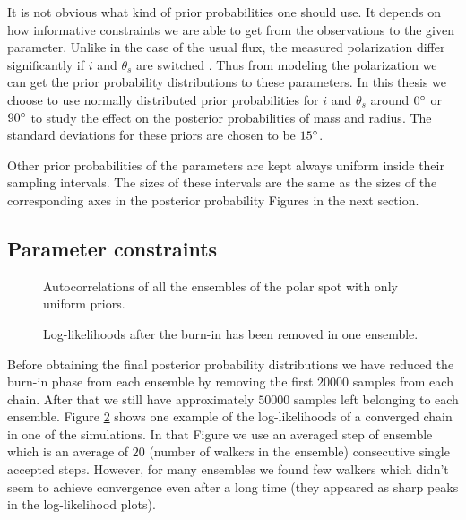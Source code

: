 \documentclass{wihuri}
\def\thetas{\theta_{s}}
\begin{document}
It is not obvious what kind of prior probabilities one should use. It depends on how informative constraints we are able to get from the observations to the given parameter. Unlike in the case of the usual flux, the measured polarization differ significantly if $i$ and $\thetas$ are switched \cite{poutaviironen}. Thus from modeling the polarization we can get the prior probability distributions to these parameters. In this thesis we choose to use normally distributed prior probabilities for $i$ and $\thetas$ around $0 \degree$ or $90 \degree$ to study the effect on the posterior probabilities of mass and radius. The standard deviations for these priors are chosen to be $15 \degree$. 

Other prior probabilities of the parameters are kept always uniform inside their sampling intervals. The sizes of these intervals are the same as the sizes of the corresponding axes in the posterior probability Figures in the next section. 



\subsection{Parameter constraints}

\begin{figure}
\centerline{}
\caption{Autocorrelations of all the ensembles of the polar spot with only uniform priors.
\label{fig:acexample}}
\end{figure}


\begin{figure}
\centerline{}
\caption{Log-likelihoods after the burn-in has been removed in one ensemble.
\label{fig:wexample}}
\end{figure}

Before obtaining the final posterior probability distributions we have reduced the burn-in phase from each ensemble by removing the first $20 000$ samples from each chain. After that we still have approximately $50 000$ samples left belonging to each ensemble.  Figure \ref{fig:wexample} shows one example of the log-likelihoods of a converged chain in one of the simulations. In that Figure we use an averaged step of ensemble which is an average of $20$ (number of walkers in the ensemble) consecutive single accepted steps. However, for many ensembles we found few walkers which didn't seem to achieve convergence even after a long time (they appeared as sharp peaks in the log-likelihood plots).
\end{document}
